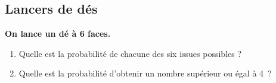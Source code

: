 \documentclass[a4paper,11pt,exos]{nsi} %
\begin{document}
\maketitle


\subsection*{Lancers de dés}

\textbf{On lance un dé à 6 faces.}
\begin{enumerate}
    \item Quelle est la probabilité de chacune des six issues possibles ? \dotfill
    \item Quelle est la  probabilité d’obtenir un nombre supérieur ou égal à 4 ? \dotfill
\end{enumerate}
\end{document}
